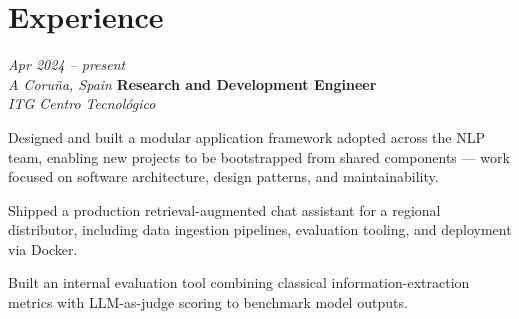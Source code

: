 \section{Experience}

\begin{twocolentry}{
\textit{Apr 2024 – present} \\
\textit{A Coruña, Spain}}
\textbf{Research and Development Engineer} \\
\hspace*{2em}\textit{ITG Centro Tecnológico}
\end{twocolentry}

\vspace{0.2 cm}
\begin{onecolentry}
\begin{highlights}
    \item Designed and built a modular application framework adopted across the NLP team, enabling new projects to be bootstrapped from shared components — work focused on software architecture, design patterns, and maintainability.
    \item Shipped a production retrieval-augmented chat assistant for a regional distributor, including data ingestion pipelines, evaluation tooling, and deployment via Docker.
    \item Built an internal evaluation tool combining classical information-extraction metrics with LLM-as-judge scoring to benchmark model outputs.
\end{highlights}
\end{onecolentry}